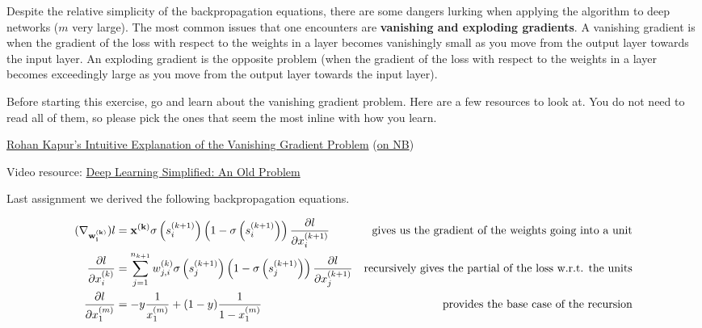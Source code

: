 \documentclass[assignment07_Solutions]{subfiles}
\begin{document}
Despite the relative simplicity of the backpropagation equations, there are some dangers lurking when applying the algorithm to deep networks ($m$ very large).  The most common issues that one encounters are \textbf{vanishing and exploding gradients}.  A vanishing gradient is when the gradient of the loss with respect to the weights in a layer becomes vanishingly small as you move from the output layer towards the input layer.  An exploding gradient is the opposite problem (when the gradient of the loss with respect to the weights in a layer becomes exceedingly large as you move from the output layer towards the input layer).

\begin{exercise}
Before starting this exercise, go and learn about the vanishing gradient problem.  Here are a few resources to look at.  You do not need to read all of them, so please pick the ones that seem the most inline with how you learn.
\begin{externalresources}
\bi
\item \href{https://ayearofai.com/rohan-4-the-vanishing-gradient-problem-ec68f76ffb9b}{Rohan Kapur's Intuitive Explanation of the Vanishing Gradient Problem} (\href{http://nb.mit.edu/f/55483}{on NB})
\item Video resource: \href{https://www.youtube.com/watch?v=SKMpmAOUa2Q}{Deep Learning Simplified: An Old Problem}
\ei
\end{externalresources}


Last assignment we derived the following backpropagation equations.

\begin{align}
(\nabla_{\mathbf{w^{(k)}_i}}) l &= \mathbf{x^{(k)}} \sigma\left (s_i^{(k+1)} \right )\left (1-\sigma\left (s_i^{(k+1)} \right )\right) \frac{\partial l}{\partial x_i^{(k+1)}} & \mbox{gives us the gradient of the weights going into a unit} \\
\frac{\partial l}{\partial x^{(k)}_i} &= \sum_{j=1}^{n_{k+1}} w^{(k)}_{j,i} \sigma \left ( s_{j}^{(k+1)} \right) \left (1-\sigma \left ( s_{j}^{(k+1)} \right)\right) \frac{\partial l}{\partial x^{(k+1)}_j} \label{eq:recursion} & \mbox{recursively gives the partial of the loss w.r.t. the units} \\
\frac{\partial l}{\partial x^{(m)}_1} &= -y\frac{1}{x_1^{(m)}} + (1-y) \frac{1}{1-x_1^{(m)}} & \mbox{provides the base case of the recursion}
\end{align}


\end{exercise}
\end{document}
